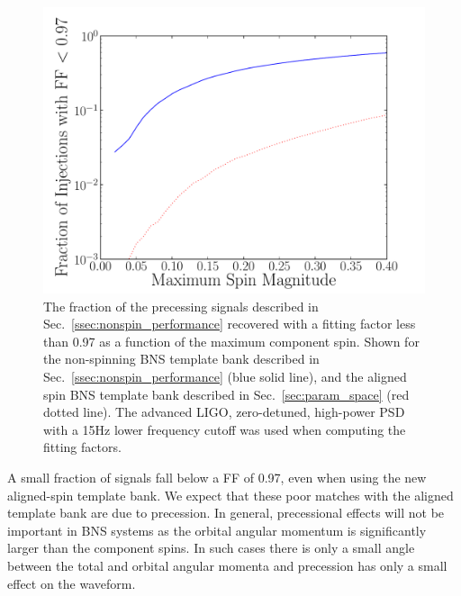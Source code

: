 \begin{figure}
\begin{center}
\includegraphics[width=1.0\textwidth]{papers/bns_spin/figure11.pdf}
\end{center}
\caption{\label{fig:anstar-st-spin} The fraction of the precessing signals described in
Sec.~\ref{ssec:nonspin_performance} recovered with a fitting factor less than 0.97 as
a function of the maximum component spin. Shown for the non-spinning
BNS template bank described in Sec.~\ref{ssec:nonspin_performance} (blue solid line),
and the aligned spin
BNS template bank described in Sec.~\ref{sec:param_space} (red dotted line). The advanced LIGO, zero-detuned,
high-power PSD with a 15Hz lower frequency cutoff was used when computing the fitting factors.}
\end{figure}

A small fraction of signals fall below a FF of 0.97, even when using the new aligned-spin template bank.
We expect that these poor matches with the aligned template bank are
due to precession. In general, precessional effects will not be important in BNS systems
as the orbital angular momentum is significantly larger than the component spins.
In such cases there is only a small angle between the total and orbital angular momenta
and precession has only a small effect on the waveform.

